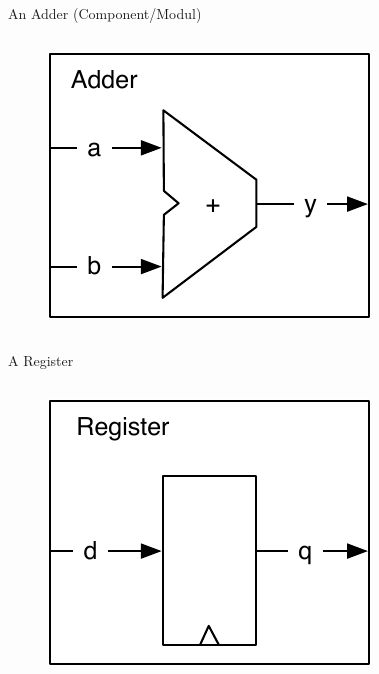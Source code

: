 \begin{frame}[fragile]{An Adder (Component/Modul)}
\begin{columns}
\begin{column}{0.4\textwidth}
\begin{figure}
  \includegraphics[scale=\scale]{../figures/components-adder}
\end{figure}
\end{column}
\begin{column}{0.6\textwidth}
\end{column}
\end{columns}
\end{frame}

\begin{frame}[fragile]{A Register}
\begin{columns}
\begin{column}{0.4\textwidth}
\begin{figure}
  \includegraphics[scale=\scale]{../figures/components-register}
\end{figure}
\end{column}
\begin{column}{0.6\textwidth}
\end{column}
\end{columns}
\end{frame}

